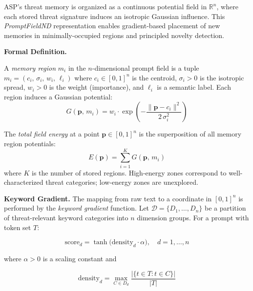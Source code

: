 \documentclass[sigconf,natbib=false]{acmart}
\begin{document}
ASP's threat memory is organized as a continuous potential field in
$\mathbb{R}^n$, where each stored threat signature induces an isotropic
Gaussian influence. This \emph{PromptFieldND} representation enables
gradient-based placement of new memories in minimally-occupied regions and
principled novelty detection.

\textbf{Formal Definition.}

\begin{definition}
\label{def:memory-region}
A \emph{memory region} $m_i$ in the $n$-dimensional prompt field is a tuple
$m_i = (c_i,\, \sigma_i,\, w_i,\, \ell_i)$ where $c_i \in [0,1]^n$ is the
centroid, $\sigma_i > 0$ is the isotropic spread, $w_i > 0$ is the weight
(importance), and $\ell_i$ is a semantic label. Each region induces a
Gaussian potential:
\begin{equation}
\label{eq:gaussian-potential}
G(\mathbf{p},\, m_i) = w_i \cdot \exp\!\left(
  -\frac{\|\mathbf{p} - c_i\|^2}{2\,\sigma_i^2}
\right)
\end{equation}
\end{definition}

\begin{definition}
\label{def:field-energy}
The \emph{total field energy} at a point $\mathbf{p} \in [0,1]^n$ is the
superposition of all memory region potentials:
\begin{equation}
\label{eq:field-energy}
E(\mathbf{p}) = \sum_{i=1}^{K} G(\mathbf{p},\, m_i)
\end{equation}
where $K$ is the number of stored regions. High-energy zones correspond to
well-characterized threat categories; low-energy zones are unexplored.
\end{definition}

\textbf{Keyword Gradient.}
The mapping from raw text to a coordinate in $[0,1]^n$ is performed by the
\emph{keyword gradient} function. Let $\mathcal{D} = \{D_1, \dots, D_n\}$ be
a partition of threat-relevant keyword categories into $n$ dimension groups.
For a prompt with token set $T$:

\begin{equation}
\label{eq:keyword-gradient}
\text{score}_d = \tanh\!\bigl(\text{density}_d \cdot \alpha\bigr),
\quad d = 1, \dots, n
\end{equation}

where $\alpha > 0$ is a scaling constant and

\begin{equation}
\label{eq:density}
\text{density}_d = \max_{C \in D_d}
  \frac{|\{t \in T : t \in C\}|}{|T|}
\end{equation}
\end{document}
